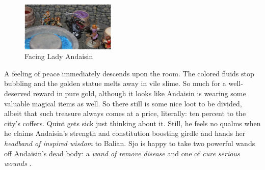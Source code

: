 \begin{figure}[h]
	\centering
	\includegraphics[width=0.4\textwidth]{images/Facing-Lady-Andaisin-523052184_mod.jpg}
	\caption{Facing Lady Andaisin}
	\label{fig:Facing-Lady-Andaisin-523052184}
\end{figure}

A feeling of peace immediately descends upon the room. The colored fluids stop bubbling and the golden statue melts away in vile slime. So much for a well-deserved reward in pure gold, although it looks like Andaisin is wearing some valuable magical items as well. So there still is some nice loot to be divided, albeit that such treasure always comes at a price, literally: ten percent to the city's coffers. Quint gets sick just thinking about it. Still, he feels no qualms when he claims Andaisin's strength and constitution boosting girdle and hands her {\itshape headband of inspired wisdom} to Balian. Sjo is happy to take two powerful wands off Andaisin's dead body: a  {\itshape wand of remove disease} and one of  {\itshape cure serious wounds} . 